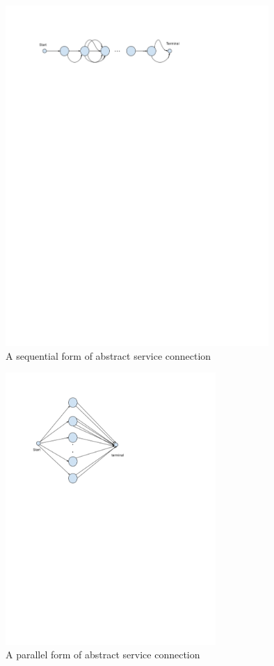 \documentclass[10pt,journal,compsoc]{IEEEtran}
\begin{document}
\begin{figure}[t]
\label{fig:seq-mdp}
\centering
\includegraphics[width=10cm]{graphs/seq-mdp}
\caption{A sequential form of abstract service connection}
\end{figure}

\begin{figure}[t]
\label{fig:par-mdp}
\includegraphics[width=8cm]{graphs/par-mdp}
\caption{A parallel form of abstract service connection}
\centering
\end{figure}
\end{document}
